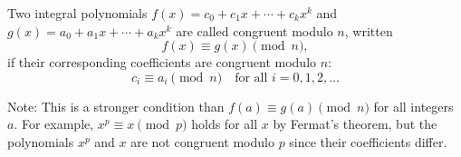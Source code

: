Two integral polynomials $f(x) = c_0 + c_1 x + \cdots + c_k x^k$ and $g(x) = a_0 + a_1 x + \cdots + a_k x^k$ are called congruent modulo $n$, written
$$f(x) \equiv g(x) \pmod{n},$$
if their corresponding coefficients are congruent modulo $n$:
$$c_i \equiv a_i \pmod{n} \quad \text{for all } i = 0, 1, 2, \ldots$$

Note: This is a stronger condition than $f(a) \equiv g(a) \pmod{n}$ for all integers $a$. For example, $x^p \equiv x \pmod{p}$ holds for all $x$ by Fermat's theorem, but the polynomials $x^p$ and $x$ are not congruent modulo $p$ since their coefficients differ.

